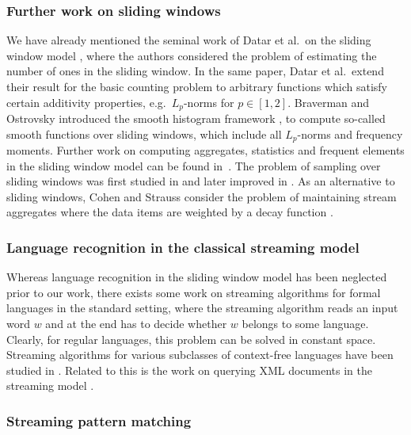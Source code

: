 \documentclass{article}\usepackage[a4paper,margin=20mm]{geometry}
\begin{document}
\subsubsection{Further work on sliding windows} \label{sec-further-SW}

We have already mentioned the seminal work of Datar et al.~on the sliding window model
\cite{DatarGIM02}, where the authors considered the problem of estimating the number of ones in the sliding window.
In the same paper, Datar et al.~extend their result for the basic counting problem 
to arbitrary functions which satisfy certain additivity properties,
e.g.~$L_p$-norms for $p \in [1,2]$.
Braverman and Ostrovsky introduced the smooth histogram framework \cite{BravermanO07},
to compute so-called smooth functions over sliding windows, which include all $L_p$-norms and frequency moments.
Further work on computing aggregates, statistics and frequent elements in the sliding window model can be found
in~\cite{ArasuM04,BabcockDMO03,Ben-BasatEF18,Ben-BasatEFK16,BravermanGLWZ18,DatarM02,FeigenbaumKZ04,GibbonsT04,GolabDDLM03}.
The problem of sampling over sliding windows was first studied in \cite{BabcockDM02}
and later improved in \cite{BravermanOZ12}.
As an alternative to sliding windows, Cohen and Strauss consider the problem of maintaining stream aggregates
where the data items are weighted by a decay function \cite{CohenS06}.

\subsubsection{Language recognition in the classical streaming model} \label{sec-language-recog}
 
Whereas language recognition in the sliding window model has been neglected prior to our work, there exists
some work on streaming algorithms for formal languages in the standard setting, where the streaming algorithm
reads an input word $w$ and at the end has to decide whether $w$ belongs to some language. Clearly, for regular
languages, this problem can be solved in constant space. Streaming algorithms for various subclasses of context-free
languages have been studied in \cite{BabuLRV13,FrancoisMRS16,JN14,KrebsLS11,MagniezMN14}. Related to this is the work on querying XML documents
in the streaming model \cite{BarloyMP21,KonradM13,SegoufinV02}.

\subsubsection{Streaming pattern matching} 
\end{document}

